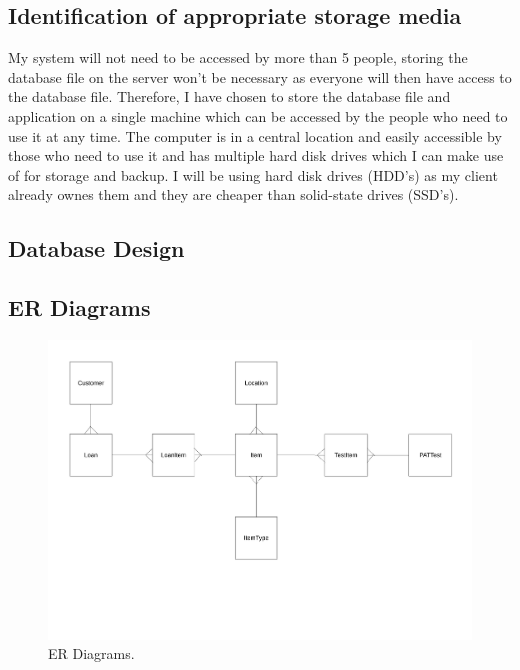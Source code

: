 \subsection{Identification of appropriate storage media}

My system will not need to be accessed by more than 5 people, storing the database file on the server won't be necessary as everyone will then have access to the database file. Therefore, I have chosen to store the database file and application on a single machine which can be accessed by the people who need to use it at any time. The computer is in a central location and easily accessible by those who need to use it and has multiple hard disk drives which I can make use of for storage and backup. I will be using hard disk drives (HDD's) as my client already ownes them and they are cheaper than solid-state drives (SSD's).

\newpage

\begin{landscape}

\section{Database Design}

\subsection{ER Diagrams}

\begin{figure}[H]
    \centerline{\includegraphics[width=550px]{./Design/ER_Diagrams/ER_Diagram.pdf}}
    \caption{ER Diagrams.} \label{fig:ER Diagrams}
\end{figure}

\end{landscape}

